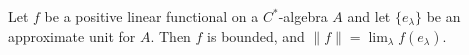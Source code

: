 Let $f$ be a positive linear functional on a $C^*$-algebra $A$ and let $\{e_\lambda\}$ be an approximate unit for $A$. Then $f$ is bounded, and $\|f\| = \lim_\lambda f(e_\lambda)$.
